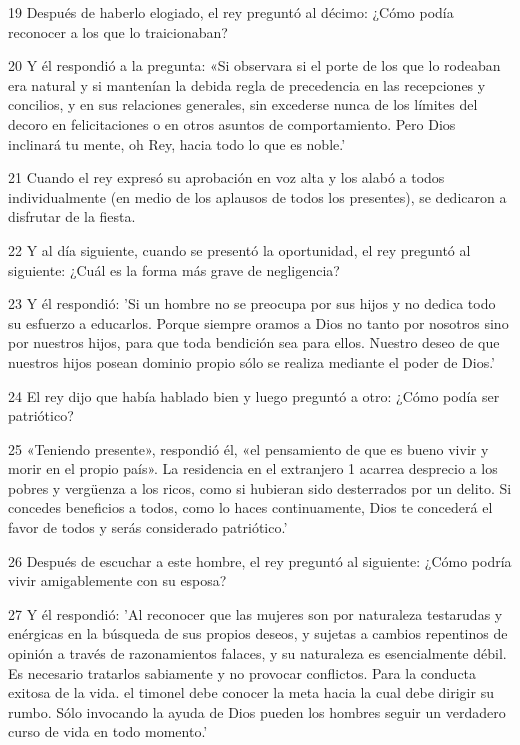 \par 19 Después de haberlo elogiado, el rey preguntó al décimo: ¿Cómo podía reconocer a los que lo traicionaban?

\par 20 Y él respondió a la pregunta: «Si observara si el porte de los que lo rodeaban era natural y si mantenían la debida regla de precedencia en las recepciones y concilios, y en sus relaciones generales, sin excederse nunca de los límites del decoro en felicitaciones o en otros asuntos de comportamiento. Pero Dios inclinará tu mente, oh Rey, hacia todo lo que es noble.'

\par 21 Cuando el rey expresó su aprobación en voz alta y los alabó a todos individualmente (en medio de los aplausos de todos los presentes), se dedicaron a disfrutar de la fiesta.

\par 22 Y al día siguiente, cuando se presentó la oportunidad, el rey preguntó al siguiente: ¿Cuál es la forma más grave de negligencia?

\par 23 Y él respondió: 'Si un hombre no se preocupa por sus hijos y no dedica todo su esfuerzo a educarlos. Porque siempre oramos a Dios no tanto por nosotros sino por nuestros hijos, para que toda bendición sea para ellos. Nuestro deseo de que nuestros hijos posean dominio propio sólo se realiza mediante el poder de Dios.'

\par 24 El rey dijo que había hablado bien y luego preguntó a otro: ¿Cómo podía ser patriótico?

\par 25 «Teniendo presente», respondió él, «el pensamiento de que es bueno vivir y morir en el propio país». La residencia en el extranjero 1 acarrea desprecio a los pobres y vergüenza a los ricos, como si hubieran sido desterrados por un delito. Si concedes beneficios a todos, como lo haces continuamente, Dios te concederá el favor de todos y serás considerado patriótico.'

\par 26 Después de escuchar a este hombre, el rey preguntó al siguiente: ¿Cómo podría vivir amigablemente con su esposa?

\par 27 Y él respondió: 'Al reconocer que las mujeres son por naturaleza testarudas y enérgicas en la búsqueda de sus propios deseos, y sujetas a cambios repentinos de opinión a través de razonamientos falaces, y su naturaleza es esencialmente débil. Es necesario tratarlos sabiamente y no provocar conflictos. Para la conducta exitosa de la vida. el timonel debe conocer la meta hacia la cual debe dirigir su rumbo. Sólo invocando la ayuda de Dios pueden los hombres seguir un verdadero curso de vida en todo momento.'

